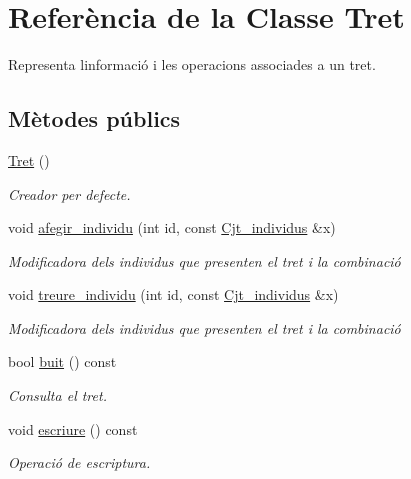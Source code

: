 \hypertarget{class_tret}{}\section{Referència de la Classe Tret}
\label{class_tret}


Representa l\textquotesingle{}informació i les operacions associades a un tret.  


\subsection*{Mètodes públics}
\begin{DoxyCompactItemize}
\item 
\hyperlink{class_tret_a3c892a10a6d209029a303b46b1deff17}{Tret} ()
\begin{DoxyCompactList}\small\item\em Creador per defecte. \end{DoxyCompactList}\item 
void \hyperlink{class_tret_ad71b260f24c6e658970654561d4b117f}{afegir\+\_\+individu} (int id, const \hyperlink{class_cjt__individus}{Cjt\+\_\+individus} \&x)
\begin{DoxyCompactList}\small\item\em Modificadora dels individus que presenten el tret i la combinació \end{DoxyCompactList}\item 
void \hyperlink{class_tret_aa30223a5d6010917441ac271294c23f4}{treure\+\_\+individu} (int id, const \hyperlink{class_cjt__individus}{Cjt\+\_\+individus} \&x)
\begin{DoxyCompactList}\small\item\em Modificadora dels individus que presenten el tret i la combinació \end{DoxyCompactList}\item 
bool \hyperlink{class_tret_a92ff938f063b16aa25033aa8a6934282}{buit} () const 
\begin{DoxyCompactList}\small\item\em Consulta el tret. \end{DoxyCompactList}\item 
void \hyperlink{class_tret_a3aeb2791bf24dc0c800af62b0fcbab27}{escriure} () const 
\begin{DoxyCompactList}\small\item\em Operació de escriptura. \end{DoxyCompactList}\end{DoxyCompactItemize}
